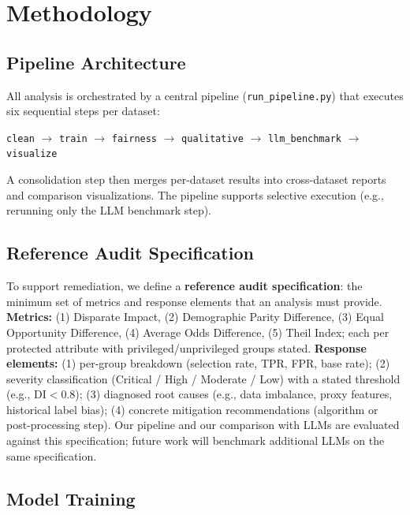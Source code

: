\documentclass[11pt,a4paper]{article}
\begin{document}
\section{Methodology}

\subsection{Pipeline Architecture}

All analysis is orchestrated by a central pipeline (\texttt{run\_pipeline.py})
that executes six sequential steps per dataset:

\begin{center}
\texttt{clean} $\rightarrow$ \texttt{train} $\rightarrow$
\texttt{fairness} $\rightarrow$ \texttt{qualitative} $\rightarrow$
\texttt{llm\_benchmark} $\rightarrow$ \texttt{visualize}
\end{center}

A consolidation step then merges per-dataset results into cross-dataset
reports and comparison visualizations. The pipeline supports selective
execution (e.g., rerunning only the LLM benchmark step).

\subsection{Reference Audit Specification}

To support remediation, we define a \textbf{reference audit specification}:
the minimum set of metrics and response elements that an analysis must
provide. \textbf{Metrics:} (1) Disparate Impact, (2) Demographic Parity
Difference, (3) Equal Opportunity Difference, (4) Average Odds Difference,
(5) Theil Index; each per protected attribute with privileged/unprivileged
groups stated. \textbf{Response elements:} (1) per-group breakdown
(selection rate, TPR, FPR, base rate); (2) severity classification
(Critical / High / Moderate / Low) with a stated threshold (e.g., DI$<$0.8);
(3) diagnosed root causes (e.g., data imbalance, proxy features, historical
label bias); (4) concrete mitigation recommendations (algorithm or
post-processing step). Our pipeline and our comparison with LLMs are
evaluated against this specification; future work will benchmark
additional LLMs on the same specification.

\subsection{Model Training}
\end{document}
